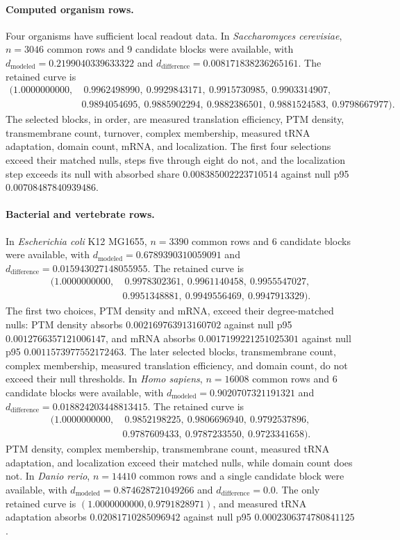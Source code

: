 \paragraph{Computed organism rows.}
Four organisms have sufficient local readout data.  In \emph{Saccharomyces cerevisiae}, $n=3046$ common rows and $9$ candidate blocks were available, with $d_{\mathrm{modeled}}=0.2199040339633322$ and $d_{\mathrm{difference}}=0.008171838236265161$.  The retained curve is
$$
\begin{aligned}
(1.0000000000,&\ 0.9962498990,\ 0.9929843171,\ 0.9915730985,\ 0.9903314907,\\
&0.9894054695,\ 0.9885902294,\ 0.9882386501,\ 0.9881524583,\ 0.9798667977).
\end{aligned}
$$
The selected blocks, in order, are measured translation efficiency, PTM density, transmembrane count, turnover, complex membership, measured tRNA adaptation, domain count, mRNA, and localization.  The first four selections exceed their matched nulls, steps five through eight do not, and the localization step exceeds its null with absorbed share $0.008385002223710514$ against null p95 $0.00708487840939486$.

\paragraph{Bacterial and vertebrate rows.}
In \emph{Escherichia coli} K12 MG1655, $n=3390$ common rows and $6$ candidate blocks were available, with $d_{\mathrm{modeled}}=0.6789390310059091$ and $d_{\mathrm{difference}}=0.015943027148055955$.  The retained curve is
$$
\begin{aligned}
(1.0000000000,&\ 0.9978302361,\ 0.9961140458,\ 0.9955547027,\\
&0.9951348881,\ 0.9949556469,\ 0.9947913329).
\end{aligned}
$$
The first two choices, PTM density and mRNA, exceed their degree-matched nulls: PTM density absorbs $0.002169763913160702$ against null p95 $0.0012766357121006147$, and mRNA absorbs $0.0017199221251025301$ against null p95 $0.0011573977552172463$.  The later selected blocks, transmembrane count, complex membership, measured translation efficiency, and domain count, do not exceed their null thresholds.  In \emph{Homo sapiens}, $n=16008$ common rows and $6$ candidate blocks were available, with $d_{\mathrm{modeled}}=0.9020707321191321$ and $d_{\mathrm{difference}}=0.018824203448813415$.  The retained curve is
$$
\begin{aligned}
(1.0000000000,&\ 0.9852198225,\ 0.9806696940,\ 0.9792537896,\\
&0.9787609433,\ 0.9787233550,\ 0.9723341658).
\end{aligned}
$$
PTM density, complex membership, transmembrane count, measured tRNA adaptation, and localization exceed their matched nulls, while domain count does not.  In \emph{Danio rerio}, $n=14410$ common rows and a single candidate block were available, with $d_{\mathrm{modeled}}=0.874628721049266$ and $d_{\mathrm{difference}}=0.0$.  The only retained curve is $(1.0000000000,0.9791828971)$, and measured tRNA adaptation absorbs $0.02081710285096942$ against null p95 $0.0002306374780841125$.

